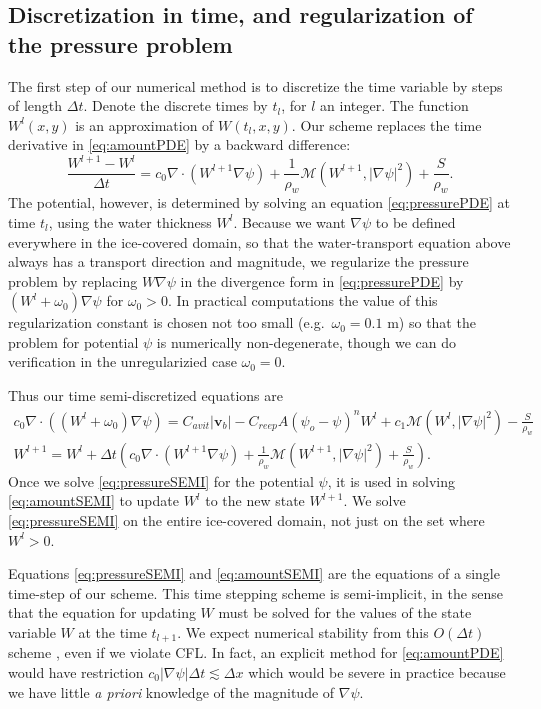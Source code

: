 \documentclass[11pt]{amsart}
\newcommand{\bv}{\mathbf{v}}
\newcommand{\Cavit}{C_{avit}}
\newcommand{\Creep}{C_{reep}}
\begin{document}
\subsection*{Discretization in time, and regularization of the pressure problem}  The first step of our numerical method is to discretize the time variable by steps of length $\Delta t$.  Denote the discrete times by $t_l$, for $l$ an integer.  The function $W^l(x,y)$ is an approximation of $W(t_l,x,y)$.  Our scheme replaces the time derivative in \eqref{eq:amountPDE} by a backward difference:
	$$\frac{W^{l+1} - W^{l}}{\Delta t} = c_0 \nabla \cdot \left(W^{l+1} \nabla \psi\right) + \frac{1}{\rho_w} \mathcal{M}(W^{l+1},|\nabla \psi|^2) + \frac{S}{\rho_w}.$$
The potential, however, is determined by solving an equation \eqref{eq:pressurePDE} at time $t_l$, using the water thickness $W^l$.  Because we want $\nabla\psi$ to be defined everywhere in the ice-covered domain, so that the water-transport equation above always has a transport direction and magnitude, we regularize the pressure problem by replacing $W\nabla \psi$ in the divergence form in \eqref{eq:pressurePDE} by $(W^l + \omega_0) \nabla \psi$ for $\omega_0>0$.  In practical computations the value of this regularization constant is chosen not too small (e.g.~$\omega_0=0.1$ m) so that the problem for potential $\psi$ is numerically non-degenerate, though we can do verification in the unregularizied case $\omega_0=0$.

Thus our time semi-discretized equations are
\begin{gather}
c_0 \nabla \cdot \left((W^l+\omega_0) \nabla \psi\right) = \Cavit |\bv_b| - \Creep A (\psi_o - \psi)^n W^l + c_1 \mathcal{M}(W^l,|\nabla \psi|^2) - \frac{S}{\rho_w} \label{eq:pressureSEMI} \\
W^{l+1} = W^l + \Delta t \left(c_0 \nabla \cdot \left(W^{l+1} \nabla \psi\right) + \frac{1}{\rho_w} \mathcal{M}(W^{l+1},|\nabla \psi|^2) + \frac{S}{\rho_w}\right).\label{eq:amountSEMI}
\end{gather}
Once we solve \eqref{eq:pressureSEMI} for the potential $\psi$, it is used in solving \eqref{eq:amountSEMI} to update $W^l$ to the new state $W^{l+1}$.  We solve \eqref{eq:pressureSEMI} on the entire ice-covered domain, not just on the set where $W^l>0$.

Equations \eqref{eq:pressureSEMI} and \eqref{eq:amountSEMI} are the equations of a single time-step of our scheme.  This time stepping scheme is semi-implicit, in the sense that the equation for updating $W$ must be solved for the values of the state variable $W$ at the time  $t_{l+1}$.  We expect numerical stability from this $O(\Delta t)$ scheme \citep{MortonMayers}, even if we violate CFL.  In fact, an explicit method for \eqref{eq:amountPDE} would have restriction $c_0 |\nabla \psi| \Delta t \lesssim \Delta x$ which would be severe in practice because we have little \emph{a priori} knowledge of the magnitude of $\nabla \psi$.
\end{document}

